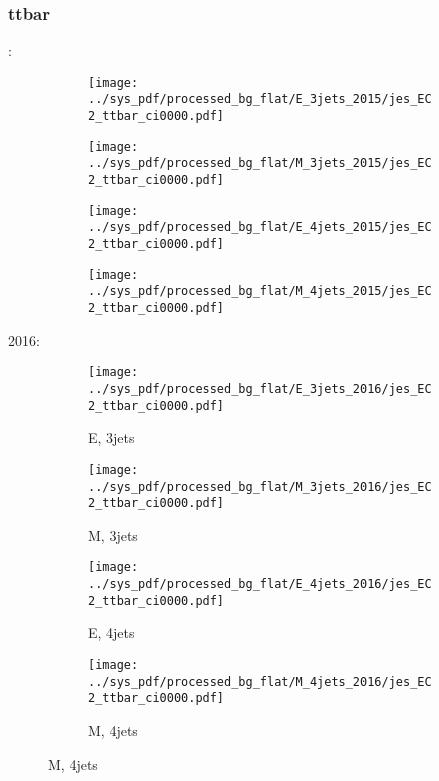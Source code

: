 \documentclass{beamer}
\begin{document}
\begin{frame}
\frametitle{ttbar}
\fontsize{5}{1}:
\begin{figure}
\centering
\begin{subfigure}[b]{0.24\textwidth}
\texttt{[image: ../sys\_pdf/processed\_bg\_flat/E\_3jets\_2015/jes\_EC2\_ttbar\_ci0000.pdf]}
\end{subfigure}
\begin{subfigure}[b]{0.24\textwidth}
\texttt{[image: ../sys\_pdf/processed\_bg\_flat/M\_3jets\_2015/jes\_EC2\_ttbar\_ci0000.pdf]}
\end{subfigure}
\begin{subfigure}[b]{0.24\textwidth}
\texttt{[image: ../sys\_pdf/processed\_bg\_flat/E\_4jets\_2015/jes\_EC2\_ttbar\_ci0000.pdf]}
\end{subfigure}
\begin{subfigure}[b]{0.24\textwidth}
\texttt{[image: ../sys\_pdf/processed\_bg\_flat/M\_4jets\_2015/jes\_EC2\_ttbar\_ci0000.pdf]}
\end{subfigure}
\end{figure}
2016:
\begin{figure}
\centering
\begin{subfigure}[b]{0.24\textwidth}
\texttt{[image: ../sys\_pdf/processed\_bg\_flat/E\_3jets\_2016/jes\_EC2\_ttbar\_ci0000.pdf]}
\captionsetup{font=tiny}
\caption{E, 3jets}
\end{subfigure}
\begin{subfigure}[b]{0.24\textwidth}
\texttt{[image: ../sys\_pdf/processed\_bg\_flat/M\_3jets\_2016/jes\_EC2\_ttbar\_ci0000.pdf]}
\captionsetup{font=tiny}
\caption{M, 3jets}
\end{subfigure}
\begin{subfigure}[b]{0.24\textwidth}
\texttt{[image: ../sys\_pdf/processed\_bg\_flat/E\_4jets\_2016/jes\_EC2\_ttbar\_ci0000.pdf]}
\captionsetup{font=tiny}
\caption{E, 4jets}
\end{subfigure}
\begin{subfigure}[b]{0.24\textwidth}
\texttt{[image: ../sys\_pdf/processed\_bg\_flat/M\_4jets\_2016/jes\_EC2\_ttbar\_ci0000.pdf]}
\captionsetup{font=tiny}
\caption{M, 4jets}
\end{subfigure}
\end{figure}
\end{frame}
\end{document}
